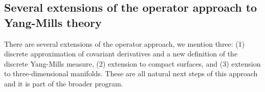 \documentclass[11pt]{article}
\numberwithin{equation}{section}
\theoremstyle{definition}
\theoremstyle{remark}
\newcommand{\1}{\mathbf 1}
\newcommand{\<}{\langle}
\renewcommand{\>}{\rangle}
\begin{document}



%
\subsection{Several extensions of the operator approach to Yang-Mills theory}\label{sec:ext_Dirac}
%
There are several extensions of the operator approach, we mention three: (1) discrete approximation of covariant derivatives and a new definition of the discrete Yang-Mills measure, (2) extension to compact surfaces, and (3) extension to three-dimensional manifolds.  These are all natural next steps of this approach and it is part of the broader program. 

\end{document}
